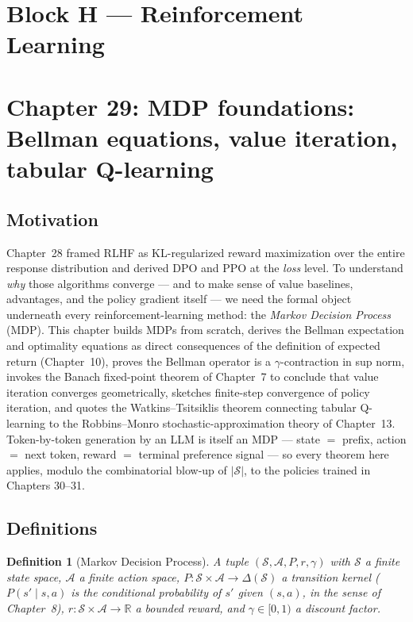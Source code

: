 \documentclass[11pt]{article}
\newtheorem{definition}[theorem]{Definition}
\theoremstyle{remark}
\begin{document}

\section*{Block H --- Reinforcement Learning}

\section*{Chapter 29: MDP foundations: Bellman equations, value iteration, tabular Q-learning}

\subsection*{Motivation}

Chapter~28 framed RLHF as KL-regularized reward maximization over the entire response distribution and derived DPO and PPO at the \emph{loss} level. To understand \emph{why} those algorithms converge --- and to make sense of value baselines, advantages, and the policy gradient itself --- we need the formal object underneath every reinforcement-learning method: the \emph{Markov Decision Process} (MDP). This chapter builds MDPs from scratch, derives the Bellman expectation and optimality equations as direct consequences of the definition of expected return (Chapter~10), proves the Bellman operator is a $\gamma$-contraction in sup norm, invokes the Banach fixed-point theorem of Chapter~7 to conclude that value iteration converges geometrically, sketches finite-step convergence of policy iteration, and quotes the Watkins--Tsitsiklis theorem connecting tabular Q-learning to the Robbins--Monro stochastic-approximation theory of Chapter~13. Token-by-token generation by an LLM is itself an MDP --- state $=$ prefix, action $=$ next token, reward $=$ terminal preference signal --- so every theorem here applies, modulo the combinatorial blow-up of $|\mathcal{S}|$, to the policies trained in Chapters 30--31.

\subsection*{Definitions}

\begin{definition}[Markov Decision Process]
A tuple $(\mathcal{S}, \mathcal{A}, P, r, \gamma)$ with $\mathcal{S}$ a finite state space, $\mathcal{A}$ a finite action space, $P : \mathcal{S}\times\mathcal{A} \to \Delta(\mathcal{S})$ a transition kernel ($P(s'\mid s,a)$ is the conditional probability of $s'$ given $(s,a)$, in the sense of Chapter~8), $r : \mathcal{S}\times\mathcal{A} \to \mathbb{R}$ a bounded reward, and $\gamma \in [0,1)$ a discount factor.
\end{definition}
\end{document}
